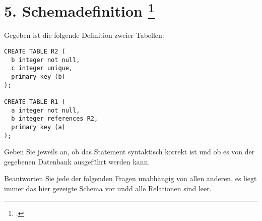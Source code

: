 \documentclass{lehramt-informatik-aufgabe}
\begin{document}
\section{5. Schemadefinition
\footcite{examen:66116:2017:09}}

Gegeben ist die folgende Definition zweier Tabellen:

\begin{verbatim}
CREATE TABLE R2 (
  b integer not null,
  c integer unique,
  primary key (b)
);

CREATE TABLE R1 (
  a integer not null,
  b integer references R2,
  primary key (a)
);
\end{verbatim}

Geben Sie jeweils an, ob das Statement syntaktisch korrekt ist und ob es
von der gegebenen Datenbank ausgeführt werden kann.

Beantworten Sie jede der folgenden Fragen unabhängig von allen anderen,
\dh es liegt immer das hier gezeigte Schema vor undd alle Relationen
sind leer.
\end{document}
